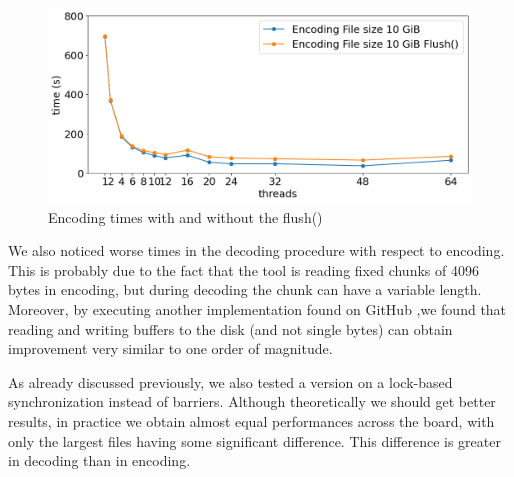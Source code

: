 \begin{figure}
	\centering
	\includegraphics[width=1\linewidth]{"../imgs/Flush vs non Flush"}
	\caption{Encoding times with and without the flush()}
	\label{fig:flush-vs-non-flush}
\end{figure}

We also noticed worse times in the decoding procedure with respect to encoding. This is probably due to the fact that the tool is reading fixed chunks of 4096 bytes in encoding, but during decoding the chunk can have a variable length.
Moreover, by executing another implementation found on GitHub \cite{HuffmanParallel2},we found that reading and writing buffers to the disk (and not single bytes) can obtain improvement very similar to one order of magnitude.


As already discussed previously, we also tested a version on a lock-based synchronization instead of barriers. Although theoretically we should get better results, in practice we obtain almost equal performances across the board, with only the largest files having some significant difference. This difference is greater in decoding than in encoding.

